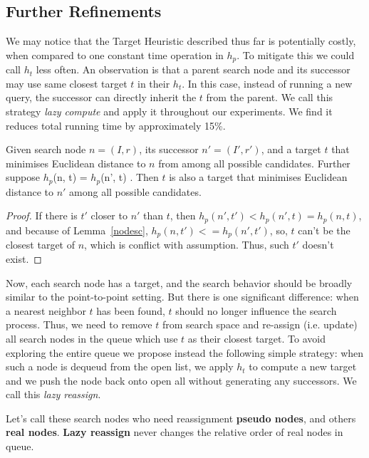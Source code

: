 \subsection{Further Refinements}
We may notice that the Target Heuristic described thus far is potentially costly,
when compared to one constant time operation in $h_p$.
To mitigate this we could call $h_t$ less often. 
An observation is that a parent search node and its successor may use same closest target $t$
in their $h_t$. In this case, instead of running a new query, the successor can directly
inherit the $t$ from the parent.  We call this strategy \textit{lazy compute} and apply it throughout our experiments.
We find it reduces total running time by approximately 15\%.

\begin{lemma}\label{lazy-compute}
  Given search node $n=(I,r)$, its successor $n'=(I', r')$,
  and a target $t$ that minimises Euclidean distance to $n$ from among all possible candidates.
  Further suppose $h_p$(n, t) = $h_p$(n', t) .
  Then $t$ is also a target that minimises Euclidean distance to $n'$ among all possible candidates.
\end{lemma}

\begin{proof}
  If there is $t'$ closer to $n'$ than $t$, then $h_p(n', t') <
  h_p(n', t) = h_p(n, t)$, and because of Lemma~\ref{nodesc},
  $h_p(n, t') <= h_p(n', t')$, so,
  $t$ can't be the closest target of $n$, which is conflict with assumption. Thus, such $t'$
  doesn't exist.
\end{proof}

Now, each search node has a target, and the search behavior should be broadly similar to 
the point-to-point setting.  But there is one significant difference:
when a nearest neighbor $t$ has been found, $t$ should no longer influence the search process.
Thus, we need to remove $t$ from search space and re-assign (i.e. update)
all search nodes in the queue which use $t$ as their closest target. 
To avoid exploring the entire queue we propose instead the following simple strategy: 
when such a node is dequeud from the open list, we apply $h_t$ to compute a new target
and we push the node back onto open all without generating any successors. 
We call this \textit{lazy reassign}.

\begin{lemma}\label{lazy-reassign}
  Let's call these search nodes who need reassignment \textbf{pseudo nodes}, and others
  \textbf{real nodes}. \textbf{Lazy reassign} never changes the relative order of real
  nodes in queue.
\end{lemma}

